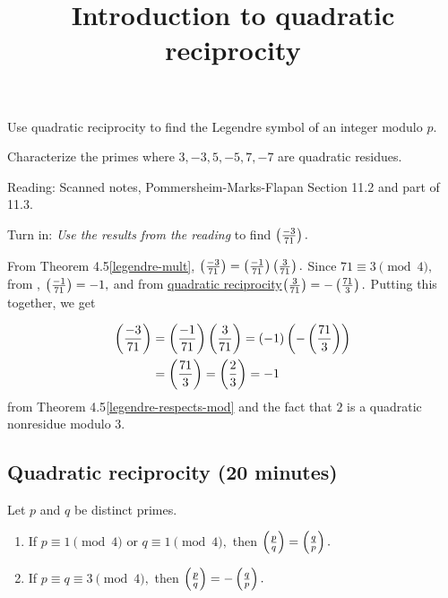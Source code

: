 \documentclass{ximera}
\title{Introduction to quadratic reciprocity}
\begin{document}
\begin{abstract}
\end{abstract}
\maketitle


\begin{obj}
    \item Use quadratic reciprocity to find the Legendre symbol of an integer modulo $p$.
    \item Characterize the primes where $3,-3,5,-5,7,-7$ are quadratic residues.
\end{obj}


\begin{pre}
    \item[Reading:] Scanned notes, Pommersheim-Marks-Flapan Section 11.2 and part of 11.3.
    \item[Turn in:] \emph{Use the results from the reading} to find $\left(\frac{-3}{71}\right).$

     \begin{solution}
     	From Theorem 4.5\ref{legendre-mult}, $\left(\frac{-3}{71}\right)=\left(\frac{-1}{71}\right)\left(\frac{3}{71}\right).$
     	Since $71\equiv3\pmod{4},$ from , $\left(\frac{-1}{71}\right)=-1,$
	and from \hyperref[quad-rec-useful-form]{quadratic reciprocity}$\left(\frac{3}{71}\right)=-\left(\frac{71}{3}\right).$ Putting this together, we get
	
		\begin{align*}
		 	\left(\frac{-3}{71}\right)&=\left(\frac{-1}{71}\right)\left(\frac{3}{71}\right)=(-1)\left(-\left(\frac{71}{3}\right)\right)\\
				&=\left(\frac{71}{3}\right)=\left(\frac{2}{3}\right)=-1
		\end{align*}
	from Theorem 4.5\ref{legendre-respects-mod} and the fact that $2$ is a quadratic nonresidue modulo $3.$
     \end{solution}
\end{pre}


\subsection{Quadratic reciprocity (20 minutes)}

\begin{theorem}\label{quad-rec-useful-form}
	Let $p$ and $q$ be distinct primes.  
	\begin{enumerate}[label=(\alph*)]
		\item If $p\equiv 1 \pmod{4}$ or $q\equiv 1\pmod{4},$ then $\left(\frac{p}{q}\right)=\left(\frac{q}{p}\right).$
 		\item If $p\equiv q \equiv 3 \pmod{4},$ then $\left(\frac{p}{q}\right)=-\left(\frac{q}{p}\right).$
	\end{enumerate}
\end{theorem}
\end{document}
